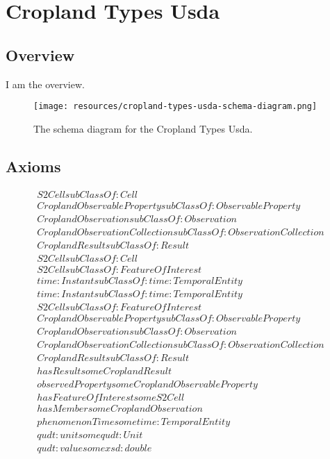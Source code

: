 
\section{Cropland Types Usda}
\label{sec:cropland-types-usda}
\subsection{Overview}
\label{ssec:overview}

I am the overview.

\begin{figure}[h!]
  \begin{center}
    \texttt{[image: resources/cropland-types-usda-schema-diagram.png]}
  \end{center}
  \caption{The schema diagram for the Cropland Types Usda.}
  \label{fig:ov-diagram}
\end{figure}


\subsection{Axioms}
\begin{align}
  S2Cell subClassOf: Cell\\
  CroplandObservableProperty subClassOf: ObservableProperty\\
  CroplandObservation subClassOf: Observation\\
  CroplandObservationCollection subClassOf: ObservationCollection\\
  CroplandResult subClassOf: Result\\
  S2Cell subClassOf: Cell\\
  S2Cell subClassOf: FeatureOfInterest\\
  time:Instant subClassOf: time:TemporalEntity\\
  time:Instant subClassOf: time:TemporalEntity\\
  S2Cell subClassOf: FeatureOfInterest\\
  CroplandObservableProperty subClassOf: ObservableProperty\\
  CroplandObservation subClassOf: Observation\\
  CroplandObservationCollection subClassOf: ObservationCollection\\
  CroplandResult subClassOf: Result\\
  hasResult some CroplandResult \\
  observedProperty some CroplandObservableProperty \\
  hasFeatureOfInterest some S2Cell \\
  hasMember some CroplandObservation \\
  phenomenonTime some time:TemporalEntity \\
  qudt:unit some qudt:Unit \\
  qudt:value some xsd:double \end{align}


